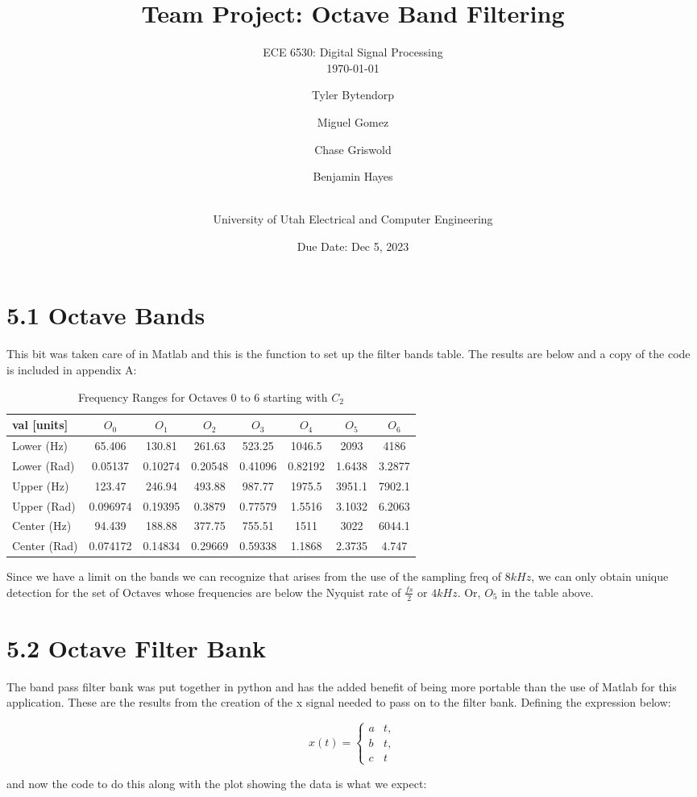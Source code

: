 \documentclass[a4paper, 11pt]{exam}
\title{Team Project: Octave Band Filtering}
\subtitle{ECE 6530: Digital Signal Processing \\
\today\\}
\author{ Tyler Bytendorp \and Miguel Gomez \and Chase Griswold \and Benjamin Hayes \and\\
University of Utah Electrical and Computer Engineering}
\date{Due Date: Dec 5, 2023}
\begin{document}
\maketitle
\noindent

\section*{5.1 Octave Bands}
This bit was taken care of in Matlab and this is the function to set up the filter bands table. The results are below and a copy of the code is included in appendix A:
\begin{table}[!ht]
\centering
\begin{tabular}{|l|c|c|c|c|c|c|c|}
\hline
val [units]   & $O_0$ & $O_1$ & $O_2$ & $O_3$ & $O_4$ & $O_5$ & $O_6$ \\
\hline
Lower (Hz)   & 65.406   & 130.81   & 261.63   & 523.25   & 1046.5   & 2093     & 4186    \\
\hline
Lower (Rad)  & 0.05137  & 0.10274  & 0.20548  & 0.41096  & 0.82192  & 1.6438   & 3.2877  \\
\hline
Upper (Hz)   & 123.47   & 246.94   & 493.88   & 987.77   & 1975.5   & 3951.1   & 7902.1  \\
\hline
Upper (Rad)  & 0.096974 & 0.19395  & 0.3879   & 0.77579  & 1.5516   & 3.1032   & 6.2063  \\
\hline
Center (Hz)  & 94.439   & 188.88   & 377.75   & 755.51   & 1511     & 3022     & 6044.1  \\
\hline
Center (Rad) & 0.074172 & 0.14834  & 0.29669  & 0.59338  & 1.1868   & 2.3735   & 4.747   \\
\hline
\end{tabular}
\caption{Frequency Ranges for Octaves 0 to 6 starting with $C_2$}
\end{table}
Since we have a limit on the bands we can recognize that arises from the use of the sampling freq of $8kHz$, we can only obtain unique detection for the set of Octaves whose frequencies are below the Nyquist rate of $\frac{fs}{2}$ or $4kHz$. Or, $O_5$ in the table above.

\section*{5.2 Octave Filter Bank}
The band pass filter bank was put together in python and has the added benefit of being more portable than the use of Matlab for this application. These are the results from the creation of the x signal needed to pass on to the filter bank. Defining the expression below:
\begin{center}
  \[
    x(t) =
    \begin{cases}
      a & t , \\
      b & t , \\
      c & t
    \end{cases}
    \]
  \end{center}
  \newpage
  and now the code to do this along with the plot showing the data is what we expect:
  \newpage
\end{document}
